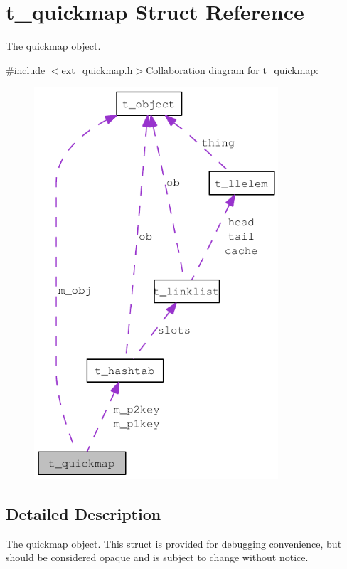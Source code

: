 \hypertarget{structt__quickmap}{
\section{t\_\-quickmap Struct Reference}
\label{structt__quickmap}
}


The quickmap object.  


{\ttfamily \#include $<$ext\_\-quickmap.h$>$}Collaboration diagram for t\_\-quickmap:\nopagebreak
\begin{figure}[H]
\begin{center}
\leavevmode
\includegraphics[width=257pt]{structt__quickmap__coll__graph}
\end{center}
\end{figure}


\subsection{Detailed Description}
The quickmap object. This struct is provided for debugging convenience, but should be considered opaque and is subject to change without notice. 